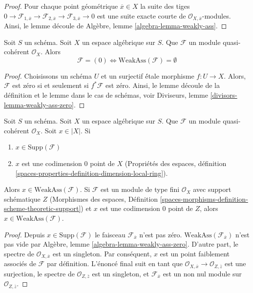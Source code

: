 \begin{proof}
Pour chaque point géométrique $\overline{x} \in X$
la suite des tiges
$0 \to \mathcal{F}_{1, \overline{x}} \to
\mathcal{F}_{2, \overline{x}} \to
\mathcal{F}_{3, \overline{x}} \to 0$
est une suite exacte courte de $\mathcal{O}_{X, \overline{x}}$-modules.
Ainsi, le lemme découle de
Algèbre, lemme \ref{algebra-lemma-weakly-ass}.
\end{proof}

\begin{lemma}
\label{lemma-weakly-ass-zero}
Soit $S$ un schéma. Soit $X$ un espace algébrique sur $S$.
Que $\mathcal{F}$ un module quasi-cohérent $\mathcal{O}_X$.
Alors
$$
\mathcal{F} = (0) \Leftrightarrow \text{WeakAss}(\mathcal{F}) = \emptyset
$$
\end{lemma}

\begin{proof}
Choisissons un schéma $U$ et un surjectif \'étale morphisme $f : U \to X$.
Alors, $\mathcal{F}$ est zéro si et seulement si $f^*\mathcal{F}$ est zéro.
Ainsi, le lemme découle de la définition et le lemme dans le
cas de schémas, voir
Diviseurs, lemme \ref{divisors-lemma-weakly-ass-zero}.
\end{proof}

\begin{lemma}
\label{lemma-minimal-support-in-weakly-ass}
Soit $S$ un schéma. Soit $X$ un espace algébrique sur $S$.
Que $\mathcal{F}$ un module quasi-cohérent $\mathcal{O}_X$.
Soit $x \in |X|$. Si
\begin{enumerate}
\item $x \in \text{Supp}(\mathcal{F})$
\item $x$ est une codimension $0$ point de $X$
(Propriétés des espaces, définition
\ref{spaces-properties-definition-dimension-local-ring}).
\end{enumerate}
Alors $x \in \text{WeakAss}(\mathcal{F})$. Si $\mathcal{F}$
est un module de type fini $\mathcal{O}_X$ avec support schématique $Z$
(Morphismes des espaces, Définition
\ref{spaces-morphisms-definition-scheme-theoretic-support})
et $x$ est une codimension $0$ point de $Z$, alors
$x \in \text{WeakAss}(\mathcal{F})$.
\end{lemma}

\begin{proof}
Depuis $x \in \text{Supp}(\mathcal{F})$ le faisceau
$\mathcal{F}_{\overline{x}}$ n'est pas zéro.
$\text{WeakAss}(\mathcal{F}_{\overline{x}})$
n'est pas vide par
Algèbre, lemme \ref{algebra-lemma-weakly-ass-zero}.
D'autre part, le spectre de $\mathcal{O}_{X, \overline{x}}$
est un singleton. Par conséquent, $x$ est un point faiblement associés de
$\mathcal{F}$ par définition. L'énoncé final suit
en tant que $\mathcal{O}_{X, \overline{x}} \to \mathcal{O}_{Z, \overline{z}}$
est une surjection, le spectre de $\mathcal{O}_{Z, \overline{z}}$
est un singleton, et $\mathcal{F}_{\overline{x}}$ est un non nul
module sur $\mathcal{O}_{Z, \overline{z}}$.
\end{proof}

